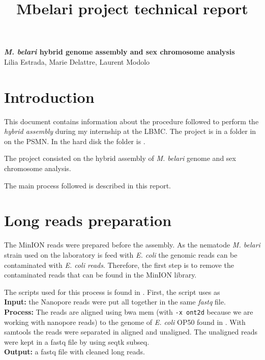 \documentclass[a4paper,12pt]{article}
\title{Mbelari project technical report}
\begin{document}
\begin{center}
\LARGE{\textbf{\textit{M. belari} hybrid genome assembly and sex chromosome analysis}}\\
\large{Lilia Estrada, Marie Delattre, Laurent Modolo}\\[0.5cm]
\end{center}

\tableofcontents


\section{Introduction}
This document contains information about the procedure followed to perform the \textit{hybrid assembly} during my internship at the LBMC.
The project is in a folder in  on the PSMN. In the hard disk the folder is .


The project consisted on the hybrid assembly of \textit{M. belari} genome and sex chromosome analysis.

The main process followed is described in this report.

\section{Long reads preparation}
The MinION reads were prepared before the assembly. As the nematode \textit{M. belari} strain used on the laboratory is feed with \textit{E. coli} the genomic reads can be contaminated with \textit{E. coli reads}. Therefore, the first step is to remove the contaminated reads that can be found in the MinION library.

The scripts used for this process is found in .
First, the script  uses as\\
\textbf{Input:} the Nanopore reads were put all together in the same \textit{fastq} file.\\
\textbf{Process:} The reads are aligned using bwa mem (with \texttt{-x ont2d} because we are working with nanopore reads) to the genome of \textit{E. coli} OP50 found in . With samtools the reads were separated in aligned and unaligned. The unaligned reads were kept in a fastq file by using seqtk subseq.\\
\textbf{Output:} 
a fastq file with cleaned long reads.
\end{document}
